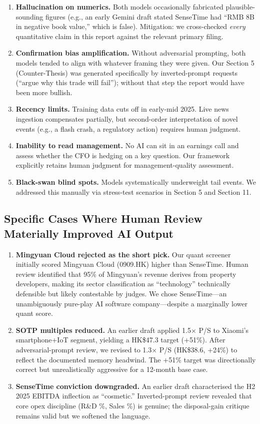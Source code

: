 \documentclass[11pt,a4paper]{article}
\begin{document}
\begin{enumerate}
\item \textbf{Hallucination on numerics.} Both models occasionally fabricated plausible-sounding figures (e.g., an early Gemini draft stated SenseTime had ``RMB 8B in negative book value,'' which is false). Mitigation: we cross-checked \textit{every} quantitative claim in this report against the relevant primary filing.
\item \textbf{Confirmation bias amplification.} Without adversarial prompting, both models tended to align with whatever framing they were given. Our Section 5 (Counter-Thesis) was generated specifically by inverted-prompt requests (``argue why this trade will fail''); without that step the report would have been more bullish.
\item \textbf{Recency limits.} Training data cuts off in early-mid 2025. Live news ingestion compensates partially, but second-order interpretation of novel events (e.g., a flash crash, a regulatory action) requires human judgment.
\item \textbf{Inability to read management.} No AI can sit in an earnings call and assess whether the CFO is hedging on a key question. Our framework explicitly retains human judgment for management-quality assessment.
\item \textbf{Black-swan blind spots.} Models systematically underweight tail events. We addressed this manually via stress-test scenarios in Section 5 and Section 11.
\end{enumerate}

\subsection{Specific Cases Where Human Review Materially Improved AI Output}

\begin{enumerate}
\item \textbf{Mingyuan Cloud rejected as the short pick.} Our quant screener initially scored Mingyuan Cloud (0909.HK) higher than SenseTime. Human review identified that 95\% of Mingyuan's revenue derives from property developers, making its sector classification as ``technology'' technically defensible but likely contestable by judges. We chose SenseTime—an unambiguously pure-play AI software company—despite a marginally lower quant score.
\item \textbf{SOTP multiples reduced.} An earlier draft applied 1.5$\times$ P/S to Xiaomi's smartphone+IoT segment, yielding a HK\$47.3 target (+51\%). After adversarial-prompt review, we revised to 1.3$\times$ P/S (HK\$38.6, +24\%) to reflect the documented memory headwind. The +51\% target was directionally correct but unrealistically aggressive for a 12-month base case.
\item \textbf{SenseTime conviction downgraded.} An earlier draft characterised the H2 2025 EBITDA inflection as ``cosmetic.'' Inverted-prompt review revealed that core opex discipline (R\&D \%, Sales \%) is genuine; the disposal-gain critique remains valid but we softened the language.
\end{enumerate}
\end{document}
